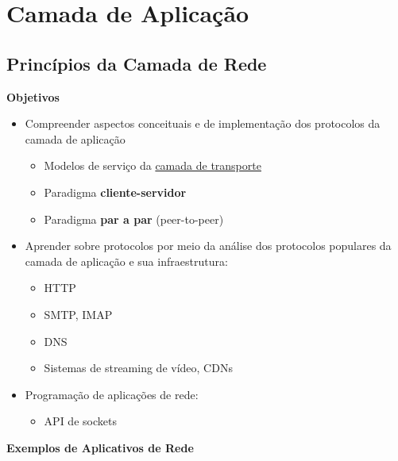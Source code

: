 \section{Camada de Aplicação}

\subsection{Princípios da Camada de Rede}

    \textbf{Objetivos}

    \begin{itemize}[left=0.5cm, align=left, nosep]    
        \item Compreender aspectos conceituais e de implementação dos protocolos da camada de aplicação
        \begin{itemize}[left=0.5cm, nosep, label=$\hookrightarrow$]
            \item Modelos de serviço da \underline{camada de transporte}
            \item Paradigma \textbf{cliente-servidor}
            \item Paradigma \textbf{par a par} (peer-to-peer)
        \end{itemize}

        \item Aprender sobre protocolos por meio da análise dos protocolos populares da camada de aplicação e sua infraestrutura:   
         \begin{itemize}[left=0.5cm, nosep, label=$\hookrightarrow$]
            \item HTTP
            \item SMTP, IMAP
            \item DNS
            \item Sistemas de streaming de vídeo, CDNs
        \end{itemize}
    
        \item Programação de aplicações de rede:
        \begin{itemize}[left=0.5cm, nosep, label=$\hookrightarrow$]
            \item API de sockets
        \end{itemize}

    \end{itemize}  

    \textbf{Exemplos de Aplicativos de Rede}

